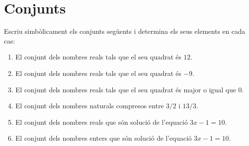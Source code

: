 

\section{Conjunts}

\begin{exer}
Escriu simb\`{o}licament els conjunts seg\"{u}ents i determina els seus
elements en cada cas:

\begin{enumerate}
\item El conjunt dels nombres reals tals que el seu quadrat \'{e}s $12$.

\item El conjunt dels nombres reals tals que el seu quadrat \'{e}s $-9$.

\item El conjunt dels nombres reals tals que el seu quadrat \'{e}s major o
igual que $0$.

\item El conjunt dels nombres naturals compresos entre $3/2$ i $13/3$.

\item El conjunt dels nombres reals que s\'{o}n soluci\'{o} de l'equaci\'{o}
$3x-1=10$.

\item El conjunt dels nombres enters que s\'{o}n soluci\'{o} de l'equaci\'{o}
$3x-1=10$.
\end{enumerate}
\end{exer}

